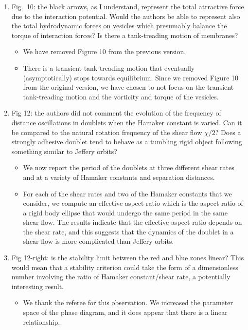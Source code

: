 \documentclass[11pt]{article}
\newcommand{\comment}[1]{{\color{blue} #1}}
\begin{document}
\begin{enumerate}
\item\comment{Fig.~10: the black arrows, as I understand, represent the
  total attractive force due to the interaction potential. Would the
  authors be able to represent also the total hydrodynamic forces on
  vesicles which presumably balance the torque of interaction forces? Is
  there a tank-treading motion of membranes?}
\begin{itemize}
  \item We have removed Figure 10 from the previous version.

  \item There is a transient tank-treading motion that eventually
    (asymptotically) stops towards equilibrium.  Since we removed Figure
    10 from the original version, we have chosen to not focus on the
    transient tank-treading motion and the vorticity and torque of the
    vesicles.
\end{itemize}

\item\comment{Fig 12: the authors did not comment the evolution of the
  frequency of distance oscillations in doublets when the Hamaker
  constant is varied. Can it be compared to the natural rotation
  frequency of the shear flow $\chi/2$? Does a strongly adhesive doublet
  tend to behave as a tumbling rigid object following something similar
  to Jeffery orbits?}
\begin{itemize}
  \item We now report the period of the doublets at three different
    shear rates and at a variety of Hamaker constants and separation
    distances.

  \item For each of the shear rates and two of the Hamaker constants
    that we consider, we compute an effective aspect ratio which is the
    aspect ratio of a rigid body ellipse that would undergo the same
    period in the same shear flow.  The results indicate that the
    effective aspect ratio depends on the shear rate, and this suggests
    that the dynamics of the doublet in a shear flow is more complicated
    than Jeffery orbits.
\end{itemize}

\item\comment{Fig 12-right: is the stability limit between the red and
  blue zones linear? This would mean that a stability criterion could
  take the form of a dimensionless number involving the ratio of Hamaker
  constant/shear rate, a potentially interesting result.}
\begin{itemize}
  \item We thank the referee for this observation.  We increased the
    parameter space of the phase diagram, and it does appear that there
    is a linear relationship.


\end{itemize}
\end{enumerate}
\end{document}
